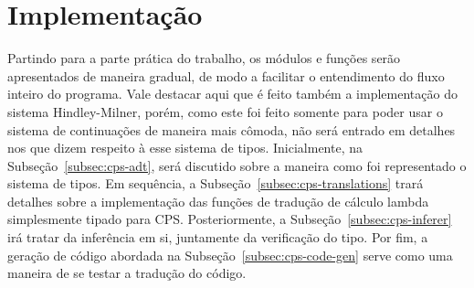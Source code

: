\section{Implementação}\label{sec:implementacao}

Partindo para a parte prática do trabalho, os módulos e funções serão apresentados de maneira gradual, de modo a facilitar o entendimento do fluxo inteiro do programa.
Vale destacar aqui que é feito também a implementação do sistema Hindley-Milner, porém, como este foi feito somente para poder usar o sistema de continuações de maneira mais cômoda, não será entrado em detalhes nos que dizem respeito à esse sistema de tipos.
Inicialmente, na Subseção~\ref{subsec:cps-adt}, será discutido sobre a maneira como foi representado o sistema de tipos.
Em sequência, a Subseção~\ref{subsec:cps-translations} trará detalhes sobre a implementação das funções de tradução de cálculo lambda simplesmente tipado para CPS.
Posteriormente, a Subseção~\ref{subsec:cps-inferer} irá tratar da inferência em si, juntamente da verificação do tipo.
Por fim, a geração de código abordada na Subseção~\ref{subsec:cps-code-gen} serve como uma maneira de se testar a tradução do código.






